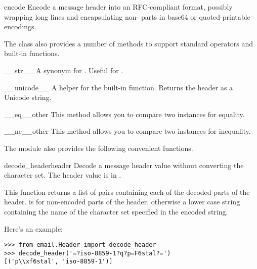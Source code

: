 \begin{methoddesc}[Header]{encode}{}
Encode a message header into an RFC-compliant format, possibly
wrapping long lines and encapsulating non-\ASCII{} parts in base64 or
quoted-printable encodings.
\end{methoddesc}

The  class also provides a number of methods to support
standard operators and built-in functions.

\begin{methoddesc}[Header]{__str__}{}
A synonym for .  Useful for
.
\end{methoddesc}

\begin{methoddesc}[Header]{__unicode__}{}
A helper for the built-in  function.  Returns the
header as a Unicode string.
\end{methoddesc}

\begin{methoddesc}[Header]{__eq__}{other}
This method allows you to compare two  instances for equality.
\end{methoddesc}

\begin{methoddesc}[Header]{__ne__}{other}
This method allows you to compare two  instances for inequality.
\end{methoddesc}

The  module also provides the following
convenient functions.

\begin{funcdesc}{decode_header}{header}
Decode a message header value without converting the character set.
The header value is in .

This function returns a list of  pairs
containing each of the decoded parts of the header.   is
 for non-encoded parts of the header, otherwise a lower
case string containing the name of the character set specified in the
encoded string.

Here's an example:

\begin{verbatim}
>>> from email.Header import decode_header
>>> decode_header('=?iso-8859-1?q?p=F6stal?=')
[('p\\xf6stal', 'iso-8859-1')]
\end{verbatim}
\end{funcdesc}

